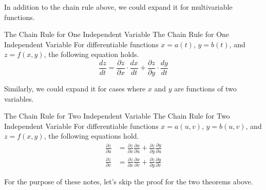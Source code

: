 \documentclass[../../../main.tex]{subfiles}
\begin{document}
In addition to the chain rule above, we could expand it for
multivariable functions.

\begin{theorem}
{The Chain Rule for One Independent Variable}
{The Chain Rule for One Independent Variable}
For differentiable functions $x = a(t)$, $y = b(t)$, and
$z = f(x, y)$, the following equation holds.
\[
\frac{dz}{dt}
= \frac{\partial z}{\partial x} \cdot \frac{dx}{dt} +
    \frac{\partial z}{\partial y} \cdot \frac{dy}{dt}
\]
\end{theorem}

Similarly, we could expand it for cases where $x$ and $y$ are
functions of two variables.

\begin{theorem}
{The Chain Rule for Two Independent Variable}
{The Chain Rule for Two Independent Variable}
For differentiable functions $x = a(u, v)$, $y = b(u, v)$,
and $z = f(x, y)$, the following equations hold.
\begin{align*}
    \frac{\partial z}{\partial u}
    &= \frac{\partial z}{\partial x} \frac{\partial x}{\partial u} +
        \frac{\partial z}{\partial y} \frac{\partial y}{\partial u} \\
    \frac{\partial z}{\partial v}
    &= \frac{\partial z}{\partial x} \frac{\partial x}{\partial v} +
        \frac{\partial z}{\partial y} \frac{\partial y}{\partial v}
\end{align*}
\end{theorem}

For the purpose of these notes, let's skip the proof for the two
theorems above.
\end{document}
